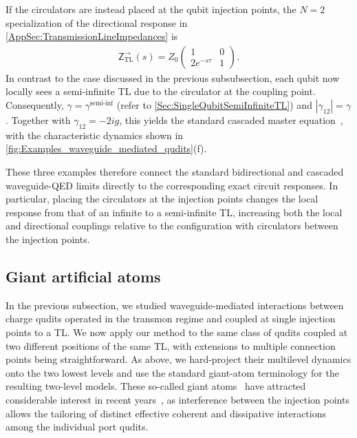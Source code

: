 \documentclass[prx,aps,twocolumn,article]{revtex4-2}
\newcommand{\msf}[1]{\mathsf{#1}}
\newcommand{\msZ}{\msf{Z}}
\newcommand{\msZTL}{\msZ_{\mathrm{TL}}}
\begin{document}
If the circulators are instead placed at the qubit injection points, the
$N=2$ specialization of the directional response in
\cref{AppSec:TransmissionLineImpedances} is
\begin{align}
    \msZTL^{\rightarrow}(s)
    =
    Z_0
    \begin{pmatrix}
        1 & 0\\
        2e^{-s \tau} & 1
    \end{pmatrix}.
\end{align}
In contrast to the case discussed in the previous subsubsection, each qubit
now locally sees a semi-infinite \gls{TL} due to the circulator at the
coupling point. Consequently,
$\gamma=\gamma^{\text{semi-inf}}$ (refer to \cref{Sec:SingleQubitSemiInfiniteTL}) and $|\gamma_{12}|=\gamma$.
Together with $\gamma_{12}=-2ig$, this yields the standard cascaded master
equation~\cite{carmichael_quantum_1993,gardiner_driving_1993}, with the
characteristic dynamics shown in
\cref{fig:Examples_waveguide_mediated_qudits}(f).

These three examples therefore connect the standard bidirectional and
cascaded waveguide-QED limits directly to the corresponding exact circuit
responses. In particular, placing the circulators at the injection points
changes the local response from that of an infinite to a semi-infinite
\gls{TL}, increasing both the local and directional couplings relative to
the configuration with circulators between the injection points.

\subsection{Giant artificial atoms}
\label{Sec:ExamplesGiantAtoms}

In the previous subsection, we studied waveguide-mediated interactions
between charge qudits operated in the transmon regime and coupled at single
injection points to a \gls{TL}. We now apply our method to the same class of
qudits coupled at two different positions of the same \gls{TL}, with
extensions to multiple connection points being straightforward. As above, we hard-project their multilevel dynamics onto the two lowest levels and use
the standard giant-atom terminology for the resulting two-level models.
These so-called giant atoms~\cite{Kockum:2014} have attracted considerable
interest in recent years~\cite{Kockum:2018,andersson:2019,kannan:2020,
Soro:2022,joshi:2023,chen:2025,jouanny:2025,TLevy-Yeyati:2026,
almanakly:2026,diekmann:2026}, as interference between the injection points allows the tailoring of distinct effective coherent and dissipative interactions among the individual port qudits.
\end{document}
